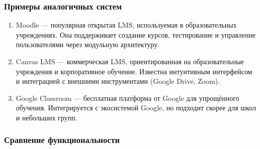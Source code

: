 \subsubsection{Примеры аналогичных систем}

\begin{enumerate}
	\item Moodle --- популярная открытая LMS, используемая в образовательных учреждениях. Она поддерживает создание курсов, тестирование и управление пользователями через модульную архитектуру.
	\item Canvas LMS --- коммерческая LMS, ориентированная на образовательные учреждения и корпоративное обучение. Известна интуитивным интерфейсом и интеграцией с внешними инструментами (Google Drive, Zoom).
	\item Google Classroom --- бесплатная платформа от Google для упрощённого обучения. Интегрируется с экосистемой Google, но подходит скорее для школ и небольших групп.
\end{enumerate}

\subsubsection{Сравнение функциональности}

